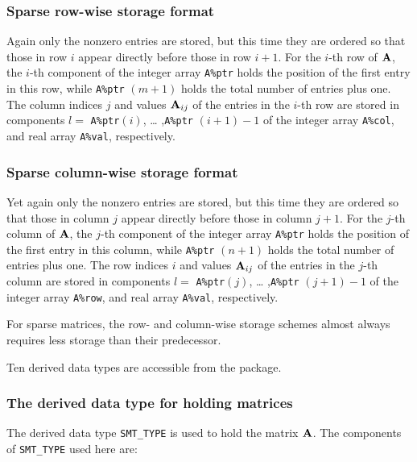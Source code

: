 \documentclass{galahad}
\begin{document}
\subsubsection{Sparse row-wise storage format}\label{rowwise}
Again only the nonzero entries are stored, but this time they are
ordered so that those in row $i$ appear directly before those in row
$i+1$. For the $i$-th row of ${\mathbf{A}}$, the $i$-th component of the integer
array {\tt A\%ptr} holds the position of the first entry in this row,
while {\tt A\%ptr} $(m+1)$ holds the total number of entries plus one.
The column indices $j$ and values ${\mathbf{A}}_{ij}$ of the entries in the
$i$-th row are stored in components $l =$ {\tt A\%ptr}$(i)$, \ldots
,{\tt A\%ptr} $(i+1)-1$ of the integer array {\tt A\%col}, and real
array {\tt A\%val}, respectively.

\subsubsection{Sparse column-wise storage format}\label{columnwise}
Yet again only the nonzero entries are stored, but this time they are
ordered so that those in column $j$ appear directly before those in column
$j+1$. For the $j$-th column of ${\mathbf{A}}$, the $j$-th component of the integer
array {\tt A\%ptr} holds the position of the first entry in this column,
while {\tt A\%ptr} $(n+1)$ holds the total number of entries plus one.
The row indices $i$ and values ${\mathbf{A}}_{ij}$ of the entries in the
$j$-th column are stored in components $l =$ {\tt A\%ptr}$(j)$, \ldots
,{\tt A\%ptr} $(j+1)-1$ of the integer array {\tt A\%row}, and real
array {\tt A\%val}, respectively.

For sparse matrices, the row- and column-wise storage schemes almost always
requires less storage than their predecessor.





\galtypes
Ten derived data types are accessible from the package.


\subsubsection{The derived data type for holding matrices}\label{typesmt}
The derived data type {\tt SMT\_TYPE} is used to hold the matrix ${\mathbf{A}}$.
The components of {\tt SMT\_TYPE} used here are:
\end{document}

